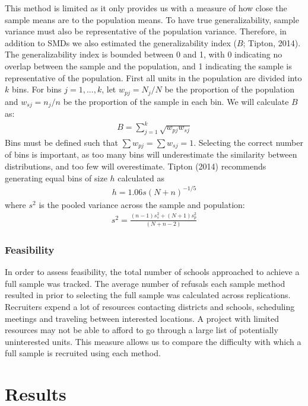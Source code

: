 \documentclass[man,floatsintext]{apa6}
\begin{document}
This method is limited as it only provides us with a measure of how close the sample means are to the population means. To have true generalizability, sample variance must also be representative of the population variance. Therefore, in addition to SMDs we also estimated the generalizability index (\(B\); Tipton, 2014). The generalizability index is bounded between 0 and 1, with 0 indicating no overlap between the sample and the population, and 1 indicating the sample is representative of the population. First all units in the population are divided into \(k\) bins. For bins \(j = 1,...,k\), let \(w_{pj} = N_j/N\) be the proportion of the population and \(w_{sj} = n_j/n\) be the proportion of the sample in each bin. We will calculate \(B\) as:
\begin{align}
  B = \sum^k_{j=1}\sqrt{w_{pj}w_{sj}}
\end{align}
Bins must be defined such that \(\sum{w_{pj}} = \sum{w_{sj}} = 1\). Selecting the correct number of bins is important, as too many bins will underestimate the similarity between distributions, and too few will overestimate. Tipton (2014) recommends generating equal bins of size \(h\) calculated as
\begin{align}
  h = 1.06s(N+n)^{-1/5}
\end{align}
where \(s^2\) is the pooled variance across the sample and population:
\begin{align}
  s^2 = \frac{(n - 1)s^2_s + (N + 1)s^2_p}{(N + n - 2)}
\end{align}

\hypertarget{feasibility}{%
\subsubsection{Feasibility}\label{feasibility}}

In order to assess feasibility, the total number of schools approached to achieve a full sample was tracked. The average number of refusals each sample method resulted in prior to selecting the full sample was calculated across replications. Recruiters expend a lot of resources contacting districts and schools, scheduling meetings and traveling between interested locations. A project with limited resources may not be able to afford to go through a large list of potentially uninterested units. This measure allows us to compare the difficulty with which a full sample is recruited using each method.

\hypertarget{results}{%
\section{Results}\label{results}}
\end{document}
